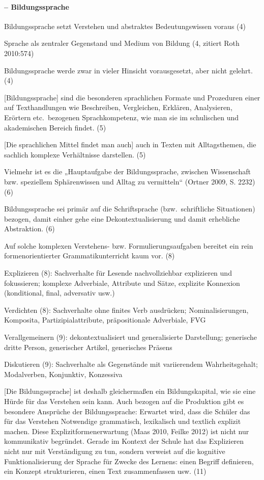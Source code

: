 
\paragraph*{\citet{Feilke2012} -- Bildungssprache}

Bildungssprache setzt Verstehen und abstraktes Bedeutungswissen voraus (4)

Sprache als zentraler Gegenstand und Medium von Bildung (4, zitiert Roth 2010:574)

Bildungssprache werde zwar in vieler Hinsicht vorausgesetzt, aber nicht gelehrt. (4)

[Bildungssprache] sind die besonderen sprachlichen Formate und Prozeduren einer auf Texthandlungen wie Beschreiben, Vergleichen, Erklären, Analysieren, Erörtern etc.\ bezogenen Sprachkompetenz, wie man sie im schulischen und akademischen Bereich findet. (5)

[Die sprachlichen Mittel findet man auch] auch in Texten mit Alltagsthemen, die sachlich komplexe Verhältnisse darstellen. (5)

Vielmehr ist es die „Hauptaufgabe der Bildungssprache, zwischen Wissenschaft bzw. speziellem Sphärenwissen und Alltag zu vermitteln“ (Ortner 2009, S. 2232) (6)

Bildungssprache sei primär auf die Schriftsprache (bzw.\ schriftliche Situationen) bezogen, damit einher gehe eine Dekontextualisierung und damit erhebliche Abstraktion. (6)

Auf solche komplexen Verstehens- bzw. Formulierungsaufgaben bereitet ein rein formenorientierter Grammatikunterricht kaum vor. (8)

Explizieren (8): Sachverhalte für Lesende nachvollziehbar explizieren und fokussieren; komplexe Adverbiale, Attribute und Sätze, explizite Konnexion (konditional, final, adversativ usw.)

Verdichten (8): Sachverhalte ohne finites Verb ausdrücken; Nominalisierungen, Komposita, Partizipialattribute, präpositionale Adverbiale, FVG

Verallgemeinern (9): dekontextualisiert und generalisierte Darstellung; generische dritte Person, generischer Artikel, generisches Präsens

Diskutieren (9): Sachverhalte als Gegenstände mit variierendem Wahrheitsgehalt; Modalverben, Konjunktiv, Konzessiva

[Die Bildungssprache] ist deshalb gleichermaßen ein Bildungskapital, wie sie eine Hürde für das Verstehen sein kann. Auch bezogen auf die Produktion gibt es besondere Ansprüche der Bildungssprache: Erwartet wird, dass die Schüler das für das Verstehen Notwendige grammatisch, lexikalisch und textlich explizit machen. Diese Explizitformenerwartung (Maas 2010, Feilke 2012) ist nicht nur kommunikativ begründet. Gerade im Kontext der Schule hat das Explizieren nicht nur mit Verständigung zu tun, sondern verweist auf die kognitive Funktionalisierung der Sprache für Zwecke des Lernens: einen Begriff definieren, ein Konzept strukturieren, einen Text zusammenfassen usw. (11)

